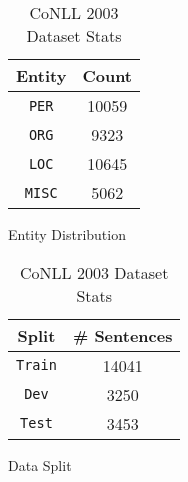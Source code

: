 \begin{table}[h!]
\begin{subtable}[t]{.48\linewidth}
\centering
\begin{tabular}{|c|c|}\hline
	\textbf{Entity} & \textbf{Count}\\\hline
	\texttt{PER} & 10059\\\hline
	\texttt{ORG} & 9323\\\hline
	\texttt{LOC} & 10645\\\hline
	\texttt{MISC} & 5062\\\hline
	\end{tabular}
	\caption{Entity Distribution}
	\label{tab:conll_entity_distribution}
\end{subtable}
\begin{subtable}[t]{.48\linewidth}
\centering
\begin{tabular}{|c|c|}\hline
	\textbf{Split} & \textbf{\# Sentences}\\\hline
	\texttt{Train} & 14041\\\hline
	\texttt{Dev} & 3250\\\hline
	\texttt{Test} & 3453\\\hline
	\end{tabular}
	\caption{Data Split}
	\label{tab:conll_dataset_split}
\end{subtable}
\caption{CoNLL 2003 Dataset Stats}
\end{table}
